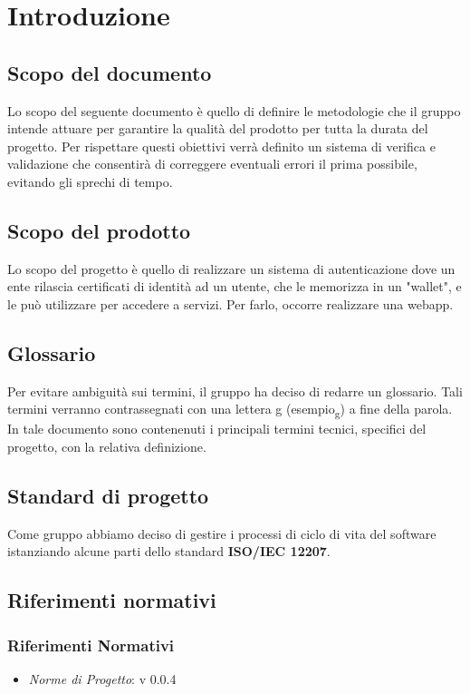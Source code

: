 \section{Introduzione}
\subsection{Scopo del documento}
Lo scopo del seguente documento è quello di definire le metodologie che il gruppo intende attuare per garantire la qualità del prodotto per tutta la durata del progetto.
Per rispettare questi obiettivi verrà definito un sistema di verifica e validazione che consentirà di correggere eventuali errori il prima possibile, evitando gli sprechi di tempo.
\subsection{Scopo del prodotto} %
Lo scopo del progetto è quello di realizzare un sistema di autenticazione dove un ente rilascia
certificati di identità ad un utente, che le memorizza in un "wallet", e le può utilizzare
per accedere a servizi. Per farlo, occorre realizzare una webapp.
\subsection{Glossario}
Per evitare ambiguità sui termini, il gruppo ha deciso di redarre un glossario. Tali termini verranno contrassegnati con una lettera g (esempio\textsubscript{g}) a fine della parola. In tale documento sono contenenuti i principali termini tecnici, specifici del progetto, con la relativa definizione.
\subsection{Standard di progetto}
Come gruppo abbiamo deciso di gestire i processi di ciclo di vita del software istanziando alcune parti dello standard \textbf{ISO/IEC 12207}.
\subsection{Riferimenti normativi}%
\subsubsection{Riferimenti Normativi}
\begin{itemize}
    \item \textit{Norme di Progetto}: v 0.0.4
\end{itemize}
